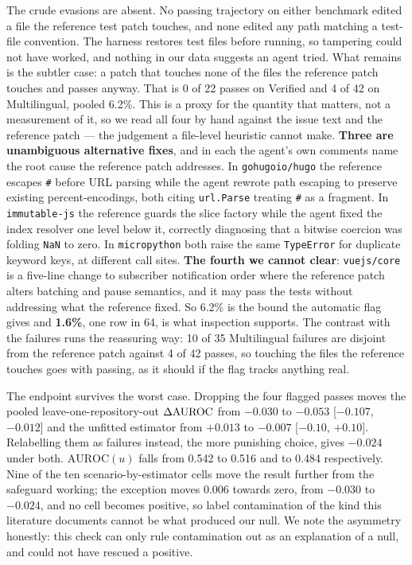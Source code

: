 \documentclass[11pt]{article}
\begin{document}
The crude evasions are absent. No passing trajectory on either benchmark edited a file the reference test patch touches, and none edited any path matching a test-file convention. The harness restores test files before running, so tampering could not have worked, and nothing in our data suggests an agent tried. What remains is the subtler case: a patch that touches none of the files the reference patch touches and passes anyway. That is 0 of 22 passes on Verified and 4 of 42 on Multilingual, pooled 6.2\%. This is a proxy for the quantity that matters, not a measurement of it, so we read all four by hand against the issue text and the reference patch --- the judgement a file-level heuristic cannot make. \textbf{Three are unambiguous alternative fixes}, and in each the agent's own comments name the root cause the reference patch addresses. In \texttt{gohugoio/hugo} the reference escapes \texttt{\#} before URL parsing while the agent rewrote path escaping to preserve existing percent-encodings, both citing \texttt{url.Parse} treating \texttt{\#} as a fragment. In \texttt{immutable-js} the reference guards the slice factory while the agent fixed the index resolver one level below it, correctly diagnosing that a bitwise coercion was folding \texttt{NaN} to zero. In \texttt{micropython} both raise the same \texttt{TypeError} for duplicate keyword keys, at different call sites. \textbf{The fourth we cannot clear}: \texttt{vuejs/core} is a five-line change to subscriber notification order where the reference patch alters batching and pause semantics, and it may pass the tests without addressing what the reference fixed. So 6.2\% is the bound the automatic flag gives and \textbf{1.6\%}, one row in 64, is what inspection supports. The contrast with the failures runs the reassuring way: 10 of 35 Multilingual failures are disjoint from the reference patch against 4 of 42 passes, so touching the files the reference touches goes with passing, as it should if the flag tracks anything real.

The endpoint survives the worst case. Dropping the four flagged passes moves the pooled leave-one-repository-out $\Delta\mathrm{AUROC}$ from $-0.030$ to $-0.053$ [$-0.107$, $-0.012$] and the unfitted estimator from $+0.013$ to $-0.007$ [$-0.10$, $+0.10$]. Relabelling them as failures instead, the more punishing choice, gives $-0.024$ under both. $\mathrm{AUROC}(u)$ falls from 0.542 to 0.516 and to 0.484 respectively. Nine of the ten scenario-by-estimator cells move the result further from the safeguard working; the exception moves 0.006 towards zero, from $-0.030$ to $-0.024$, and no cell becomes positive, so label contamination of the kind this literature documents cannot be what produced our null. We note the asymmetry honestly: this check can only rule contamination out as an explanation of a null, and could not have rescued a positive.
\end{document}
